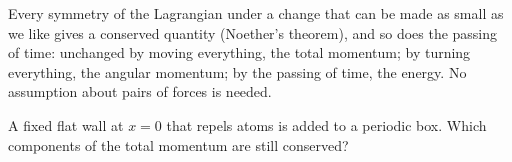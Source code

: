 \begin{keyidea}
Every symmetry of the Lagrangian under a change that can be made as small
as we like gives a conserved quantity (Noether's theorem), and so does
the passing of time: unchanged by
moving everything, the total momentum; by turning everything, the angular
momentum; by the passing of time, the energy. No assumption about pairs of
forces is needed.
\end{keyidea}


\begin{selfcheck}
A fixed flat wall at $x = 0$ that repels atoms is added to a periodic
box. Which components of the total momentum are still conserved?
\end{selfcheck}
